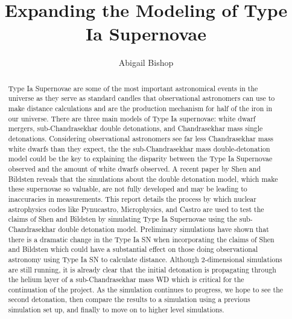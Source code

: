 \documentclass[preprint]{aastex62}
\begin{document}
\title{Expanding the Modeling of Type Ia Supernovae}
\author{Abigail Bishop}

  

\begin{abstract}
  
  Type Ia Supernovae are some of the most important astronomical events in the universe as they serve as standard candles that observational astronomers can use to make distance calculations and are the production mechanism for half of the iron in our universe. There are three main models of Type Ia supernovae: white dwarf mergers, sub-Chandrasekhar double detonations, and Chandrasekhar mass single detonations. Considering observational astronomers see far less Chandrasekhar mass white dwarfs than they expect, the the sub-Chandrasekhar mass double-detonation model could be the key to explaining the disparity between the Type Ia Supernovae observed and the amount of white dwarfs observed.  A recent paper by Shen and Bildsten reveals that the simulations about the double detonation model, which make these supernovae so valuable, are not fully developed and may be leading to inaccuracies in measurements. This report details the process by which nuclear astrophysics codes like Pynucastro, Microphysics, and Castro are used to test the claims of Shen and Bildsten by simulating Type Ia Supernovae using the sub-Chandrasekhar double detonation model. Preliminary simulations have shown that there is a dramatic change in the Type Ia SN when incorporating the claims of Shen and Bildsten which could have a substantial effect on those doing observational astronomy using Type Ia SN to calculate distance. Although 2-dimensional simulations are still running, it is already clear that the initial detonation is propagating through the helium layer of a sub-Chandrasekhar mass WD which is critical for the continuation of the project. As the simulation continues to progress, we hope to see the second detonation, then compare the results to a simulation using a previous simulation set up, and finally to move on to higher level simulations. 

\end{abstract}
\end{document}
